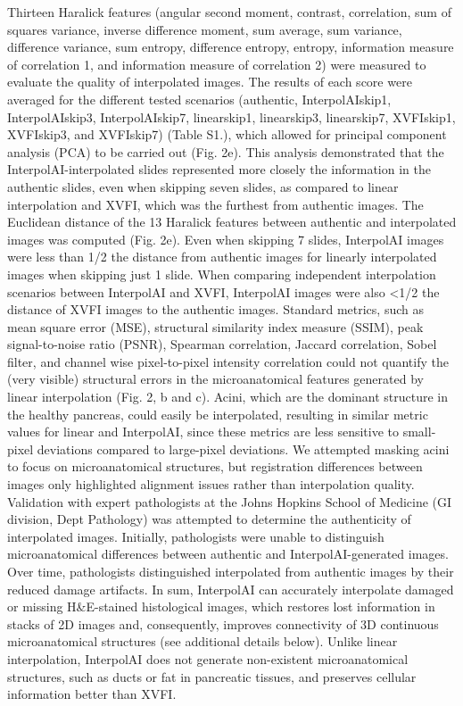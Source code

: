 \begin{refsection}
    Thirteen Haralick features (angular second moment, contrast, correlation, sum of squares variance, inverse difference moment, sum average, sum variance, difference variance, sum entropy, difference entropy, entropy, information measure of correlation 1, and information measure of correlation 2) were measured to evaluate the quality of interpolated images\cite{brynolfsson2017a,haralick1973a}. The results of each score were averaged for the different tested scenarios (authentic, InterpolAIskip1, InterpolAIskip3, InterpolAIskip7, linearskip1, linearskip3, linearskip7, XVFIskip1, XVFIskip3, and XVFIskip7) (Table S1.), which allowed for principal component analysis (PCA) to be carried out (Fig. 2e). This analysis demonstrated that the InterpolAI-interpolated slides represented more closely the information in the authentic slides, even when skipping seven slides, as compared to linear interpolation and XVFI, which was the furthest from authentic images. The Euclidean distance of the 13 Haralick features between authentic and interpolated images was computed (Fig. 2e). Even when skipping 7 slides, InterpolAI images were less than 1/2 the distance from authentic images for linearly interpolated images when skipping just 1 slide. When comparing independent interpolation scenarios between InterpolAI and XVFI, InterpolAI images were also <1/2 the distance of XVFI images to the authentic images.  
    Standard metrics, such as mean square error (MSE), structural similarity index measure (SSIM), peak signal-to-noise ratio (PSNR), Spearman correlation, Jaccard correlation, Sobel filter, and channel wise pixel-to-pixel intensity correlation could not quantify the (very visible) structural errors in the microanatomical features generated by linear interpolation (Fig. 2, b and c). Acini, which are the dominant structure in the healthy pancreas, could easily be interpolated, resulting in similar metric values for linear and InterpolAI, since these metrics are less sensitive to small-pixel deviations compared to large-pixel deviations. We attempted masking acini to focus on microanatomical structures, but registration differences between images only highlighted alignment issues rather than interpolation quality.
    Validation with expert pathologists at the Johns Hopkins School of Medicine (GI division, Dept Pathology) was attempted to determine the authenticity of interpolated images. Initially, pathologists were unable to distinguish microanatomical differences between authentic and InterpolAI-generated images. Over time, pathologists distinguished interpolated from authentic images by their reduced damage artifacts.
    In sum, InterpolAI can accurately interpolate damaged or missing H\&E-stained histological images, which restores lost information in stacks of 2D images and, consequently, improves connectivity of 3D continuous microanatomical structures (see additional details below). Unlike linear interpolation, InterpolAI does not generate non-existent microanatomical structures, such as ducts or fat in pancreatic tissues, and preserves cellular information better than XVFI.


\end{refsection}
